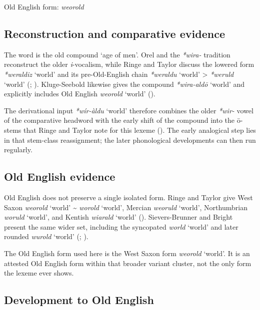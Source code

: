 \documentclass[
  british,
  a4paper,
  openany]{book}
\providecommand{\Recon}[1]{\emph{*#1}}
{\catcode`→=\active \global\def→{\ensuremath{\rightarrow}}}
\providecommand{\Recon}[1]{\emph{*#1}}
{\catcode`→=\active \global\def→{\ensuremath{\rightarrow}}}
\begin{document}
Old English form: \emph{weorold}

\subsection{Reconstruction and comparative
evidence}\label{reconstruction-and-comparative-evidence-106}

The word is the old compound `age of men'. Orel and the \emph{*wira-}
tradition reconstruct the older \emph{i}-vocalism, while Ringe and
Taylor discuss the lowered form \Recon{weraldiz} `world' and its
pre-Old-English chain \Recon{weraldu} `world' \textgreater{}
\Recon{weruld} `world' (;
).
Kluge-Seebold likewise gives the compound \Recon{wira-aldō} `world' and
explicitly includes Old English \emph{weorold} `world'
().

The derivational input {\Recon{wír-àldu} `world'} therefore combines the
older \emph{*wir-} vowel of the comparative headword with the early
shift of the compound into the ō-stems that Ringe and Taylor note for
this lexeme (). The early analogical step lies in that stem-class reassignment;
the later phonological developments can then run regularly.

\subsection{Old English evidence}\label{old-english-evidence-106}

Old English does not preserve a single isolated form. Ringe and Taylor
give West Saxon {\emph{weorold}} `world' \textasciitilde{}
{\emph{worold}} `world', Mercian {\emph{weoruld}} `world', Northumbrian
{\emph{woruld}} `world', and Kentish {\emph{wiarald}} `world'
().
Sievers-Brunner and Bright present the same wider set, including the
syncopated {\emph{world}} `world' and later rounded {\emph{wurold}}
`world' (;
).

The Old English form used here is the West Saxon form {\emph{weorold}}
`world'. It is an attested Old English form within that broader variant
cluster, not the only form the lexeme ever shows.

\subsection{Development to Old
English}\label{development-to-old-english-106}
\end{document}
